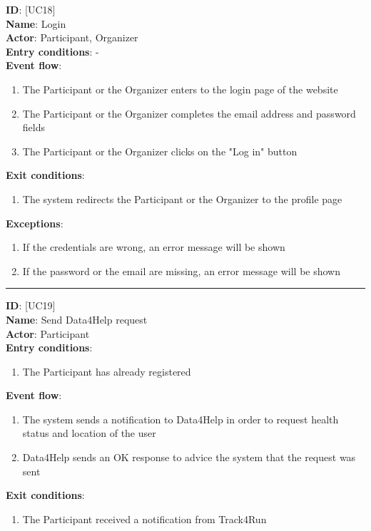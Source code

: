 \documentclass[12pt]{report}
\newcommand\usecase[1]{ [UC#1] }
\begin{document}
\begin{itemize}
  	\textbf{ID}: \usecase{18} \\
  	\textbf{Name}: Login \\
    \textbf{Actor}: Participant, Organizer \\
    \textbf{Entry conditions}: - \\
  	\textbf{Event flow}:
  		\begin{enumerate}
    			\item{The Participant or the Organizer enters to the login page of the website}
    			\item{The Participant or the Organizer completes the email address and password fields}
    			\item{The Participant or the Organizer clicks on the "Log in" button}
  		\end{enumerate}
  	\textbf{Exit conditions}:
  		\begin{enumerate}
    			\item{The system redirects the Participant or the Organizer to the profile page}
  		\end{enumerate}
  	\textbf{Exceptions}: 
  		\begin{enumerate}
    			\item{If the credentials are wrong, an error message will be shown}
    			\item{If the password or the email are missing, an error message will be shown}
  		\end{enumerate}
  	\rule{\linewidth}{0.4pt}
  	\textbf{ID}: \usecase{19} \\
  	\textbf{Name}: Send Data4Help request \\
    \textbf{Actor}: Participant \\
    \textbf{Entry conditions}: 
    		\begin{enumerate}
    			\item{The Participant has already registered}
    		\end{enumerate}
  	\textbf{Event flow}:
  		\begin{enumerate}
    			\item{The system sends a notification to Data4Help in order to request health status and location of the user}
    			\item{Data4Help sends an OK response to advice the system that the request was sent}
  		\end{enumerate}
  	\textbf{Exit conditions}:
  		\begin{enumerate}
    			\item{The Participant received a notification from Track4Run}

\end{enumerate}
\end{itemize}
\end{document}
